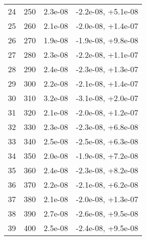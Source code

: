 \begin{table}
\begin{adjustbox}{width=1\textwidth/2}
\begin{tabular}{|c|c|c|c|}
\cline{1-4}
24 & 250 & 2.3e-08 & -2.2e-08, +5.1e-08 \\
\cline{1-4}
25 & 260 & 2.1e-08 & -2.0e-08, +1.4e-07 \\
\cline{1-4}
26 & 270 & 1.9e-08 & -1.9e-08, +9.8e-08 \\
\cline{1-4}
27 & 280 & 2.3e-08 & -2.2e-08, +1.1e-07 \\
\cline{1-4}
28 & 290 & 2.4e-08 & -2.3e-08, +1.3e-07 \\
\cline{1-4}
29 & 300 & 2.2e-08 & -2.1e-08, +1.4e-07 \\
\cline{1-4}
30 & 310 & 3.2e-08 & -3.1e-08, +2.0e-07 \\
\cline{1-4}
31 & 320 & 2.1e-08 & -2.0e-08, +1.2e-07 \\
\cline{1-4}
32 & 330 & 2.3e-08 & -2.3e-08, +6.8e-08 \\
\cline{1-4}
33 & 340 & 2.5e-08 & -2.5e-08, +6.3e-08 \\
\cline{1-4}
34 & 350 & 2.0e-08 & -1.9e-08, +7.2e-08 \\
\cline{1-4}
35 & 360 & 2.4e-08 & -2.3e-08, +8.2e-08 \\
\cline{1-4}
36 & 370 & 2.2e-08 & -2.1e-08, +6.2e-08 \\
\cline{1-4}
37 & 380 & 2.1e-08 & -2.0e-08, +1.3e-07 \\
\cline{1-4}
38 & 390 & 2.7e-08 & -2.6e-08, +9.5e-08 \\
\cline{1-4}
39 & 400 & 2.5e-08 & -2.4e-08, +9.5e-08 \\
\cline{1-4}
\end{tabular}
\end{adjustbox}
\end{table}

